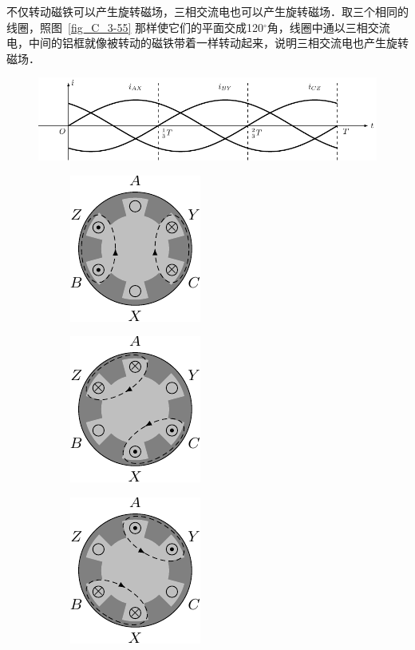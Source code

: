 不仅转动磁铁可以产生旋转磁场，三相交流电也可以产生旋转磁场．取三个相同的线圈，照图~\ref{fig_C_3-55} 那样使它们的平面交成120$^\circ$角，线圈中通以三相交流电，中间的铝框就像被转动的磁铁带着一样转动起来，说明三相交流电也产生旋转磁场．
\begin{figure}[htbp]
    \centering
    \includegraphics{fig/C/3-56.pdf}\\
    \begin{subfigure}{0.23\linewidth}
        \centering
        \includegraphics{fig/C/3-56a.pdf}
        \caption{}\label{fig_C_3-56a}
    \end{subfigure}
    \hfil
    \begin{subfigure}{0.23\linewidth}
        \centering
        \includegraphics{fig/C/3-56b.pdf}
        \caption{}\label{fig_C_3-56b}
    \end{subfigure}
    \hfil
    \begin{subfigure}{0.23\linewidth}
        \centering
        \includegraphics{fig/C/3-56c.pdf}

\end{subfigure}
\end{figure}
